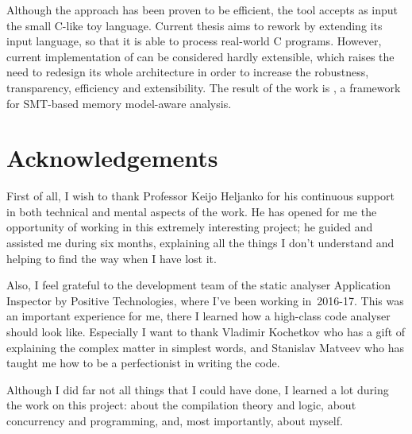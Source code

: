 \documentclass[12pt,a4paper,oneside,pdftex]{report}
\begin{document}
{Although the approach has been proven to be efficient, the tool accepts as input the small C-like toy language. %
Current thesis aims to rework \porthos{} by extending its input language, so that it is able to process real-world C programs.
However, current implementation of \porthos{} can be considered hardly extensible, which raises the need to redesign its whole architecture in order to increase the robustness, transparency, efficiency and extensibility.
The result of the work is \textit{\porthos[2]}, a framework for SMT-based memory model-aware analysis.
}


\chapter*{Acknowledgements}
First of all, I wish to thank Professor Keijo Heljanko for his continuous support in both technical and mental aspects of the work.
He has opened for me the opportunity of working in this extremely interesting project; he guided and assisted me during six months, explaining all the things I don't understand and helping to find the way when I have lost it.

Also, I feel grateful to the development team of the static analyser Application Inspector by Positive Technologies, where I've been working in~2016-17.
This was an important experience for me, there I learned how a high-class code analyser should look like.
Especially I want to thank Vladimir Kochetkov who has a gift of explaining the complex matter in simplest words, and Stanislav Matveev who has taught me how to be a perfectionist in writing the code.

Although I did far not all things that I could have done, I learned a lot during the work on this project: about the compilation theory and logic, about concurrency and programming, and, most importantly, about myself.
\end{document}

